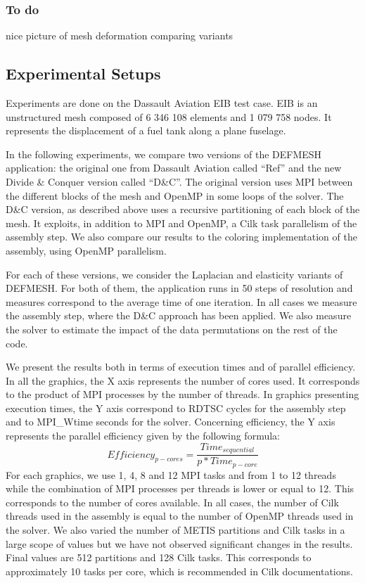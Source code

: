 \documentclass{IOS-Book-Article}
\begin{document}
\subsubsection{To do}
nice picture of mesh deformation comparing variants\\

\subsection{Experimental Setups}
Experiments are done on the Dassault Aviation EIB test case. EIB is an unstructured mesh composed of 6 346 108 elements and 1 079 758 nodes.
It represents the displacement of a fuel tank along a plane fuselage.

In the following experiments, we compare two versions of the DEFMESH application: the original one from Dassault Aviation called “Ref” and the new Divide \& Conquer
version called “D\&C”.
The original version uses MPI between the different blocks of the mesh and OpenMP in some loops of the solver.
The D\&C version, as described above uses a recursive partitioning of each block of the mesh. It exploits, in addition to MPI and OpenMP,
a Cilk task parallelism of the assembly step.
We also compare our results to the coloring implementation of the assembly, using OpenMP parallelism.

For each of these versions, we consider the Laplacian and elasticity variants of DEFMESH.
For both of them, the application runs in 50 steps of resolution and measures correspond to the average time of one iteration.
In all cases we measure the assembly step, where the D\&C approach has been applied.
We also measure the solver to estimate the impact of the data permutations on the rest of the code.

We present the results both in terms of execution times and of parallel efficiency.
In all the graphics, the X axis represents the number of cores used. It corresponds to the product of MPI processes by the number of threads.
In graphics presenting execution times, the Y axis correspond to RDTSC cycles for the assembly step and to MPI\_Wtime seconds for the solver.
Concerning efficiency, the Y axis represents the parallel efficiency given by the following formula:
$$Efficiency_{p-cores} = \frac{Time_{sequential}}{p*Time_{p-core}}$$
For each graphics, we use 1, 4, 8 and 12 MPI tasks and from 1 to 12 threads while the combination of MPI processes per threads is lower or equal to 12.
This corresponds to the number of cores available. In all cases, the number of Cilk threads used in the assembly is equal to the number of OpenMP threads used in the solver.
We also varied the number of METIS partitions and Cilk tasks in a large scope of values but we have not observed significant changes in the results.
Final values are 512 partitions and 128 Cilk tasks. This corresponds to approximately 10 tasks per core, which is recommended in Cilk documentations.
\end{document}
